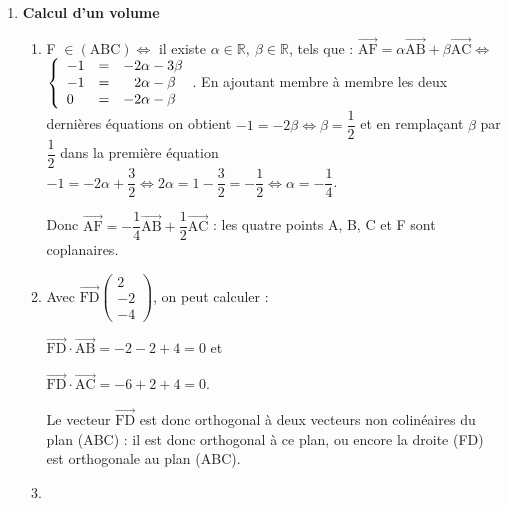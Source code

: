 \documentclass[10pt]{article}
\providecommand{\R}{\mathbb{R}}
\providecommand{\vect}[1]{\overrightarrow{#1}}
\begin{document}
\begin{enumerate}
\begin{enumerate}
	Comme AC = $\text{BC} = \sqrt{11}$, le triangle ABC est isocèle en C ; or on a vu que E est le projeté de C sur la droite (AB), donc dans le triangle isocèle (ABC), [CE] est la hauteur relative à la base [AB].
	
On a $\vect{\text{CE}}\begin{pmatrix}2\\2\\0\end{pmatrix}$, d'où CE$^2 = 1 + 4 = 8$ et CE $ = 2\sqrt{2}$.

 L'aire du triangle (ABC) est donc égale à :
	
$\mathcal{A}(\text{ABC}) = \dfrac{\text{AB} \times \text{CE}}{2} = \dfrac{2\sqrt{3} \times 2\sqrt{2}}{2} = 2 \sqrt{6}$.
		
	\end{enumerate}
\item \textbf{Calcul d'un volume}
	\begin{enumerate}
		\item 
F $\in (\text{ABC}) \iff $ il existe $\alpha \in \R, \: \beta \in \R$, tels que :
$\vect{\text{AF}} = \alpha \vect{\text{AB}} + \beta\vect{\text{AC}} \iff$\\

$  \left\{\begin{array}{l c l}
- 1 &=&- 2\alpha -3 \beta\\
- 1&=&\phantom{-}2\alpha - \beta\\
0 &=&- 2\alpha - \beta 
\end{array}\right.$. En ajoutant membre à membre les deux dernières équations on obtient $- 1 = - 2\beta \iff \beta =  \dfrac12$ et en remplaçant $\beta$ par $ \dfrac12$ dans la première équation $- 1 = - 2\alpha + \dfrac32 \iff 2\alpha = 1  - \dfrac32 = - \dfrac12 \iff \alpha = - \dfrac14$.

Donc $\vect{\text{AF}} = - \dfrac14 \vect{\text{AB}} + \dfrac12\vect{\text{AC}}$ : les quatre points A, B, C et F sont coplanaires.
		\item 
Avec $\vect{\text{FD}}\begin{pmatrix}2\\-2\\-4\end{pmatrix}$, on peut calculer :
		
$\vect{\text{FD}}\cdot \vect{\text{AB}} = - 2 - 2 + 4 = 0$ et 

$\vect{\text{FD}}\cdot \vect{\text{AC}} = - 6 + 2 + 4 = 0$.

Le vecteur $\vect{\text{FD}}$ est donc orthogonal à deux vecteurs non colinéaires du plan (ABC) : il est donc orthogonal à ce plan, ou encore la droite (FD) est orthogonale au plan (ABC).
		\item 


\end{enumerate}
\end{enumerate}
\end{document}
